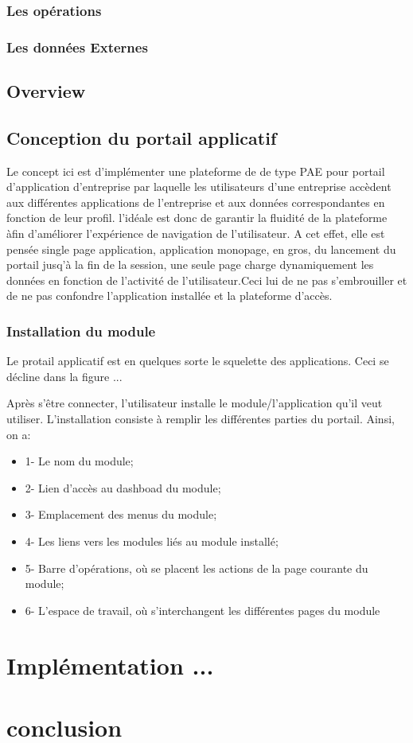 \documentclass[a4paper,12pt]{article}
\begin{document}
\subsubsection{Les opérations}
\subsubsection{Les données Externes}%

\subsection{Overview}

\subsection{Conception du portail applicatif}%
 Le concept ici est
d'implémenter une plateforme de de type PAE pour portail d'application d'entreprise par laquelle
les utilisateurs d'une entreprise accèdent aux différentes
applications de l'entreprise et aux données correspondantes en
fonction de leur profil. l'idéale est donc de garantir la
fluidité de la plateforme àfin d'améliorer l'expérience de navigation de
l'utilisateur. A cet effet, elle est pensée single page application,
application monopage, en gros, du lancement du portail jusq'à la fin de la
session, une seule page charge dynamiquement les données en fonction
de l'activité de l'utilisateur.Ceci lui de ne pas
s'embrouiller et de ne pas confondre l'application installée et la
plateforme d'accès.  
   
\subsubsection{Installation du module}
Le protail applicatif est en quelques sorte le squelette des
applications. Ceci se décline dans la figure ...

Après s'être connecter, l'utilisateur installe le module/l'application 
qu'il veut utiliser. L'installation consiste à remplir les différentes
parties du portail. Ainsi, on a:

\begin{itemize}
\item 1- Le nom du module;
\item 2- Lien d'accès au dashboad du module;
\item 3- Emplacement des menus du module;
\item 4- Les liens vers les modules liés au module installé;
\item 5- Barre d'opérations, où se placent les actions de la page
  courante du module;
\item 6- L'espace de travail, où s'interchangent les différentes pages
  du module
\end{itemize}

\section{Implémentation ...}
\section{conclusion}
\end{document}
